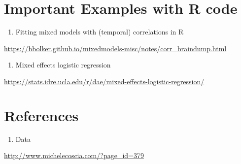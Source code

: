 \documentclass[]{book}
\providecommand{\tightlist}{%
  \setlength{\itemsep}{0pt}\setlength{\parskip}{0pt}}
\begin{document}
\hypertarget{important-examples-with-r-code}{%
\section{Important Examples with R code}\label{important-examples-with-r-code}}

\begin{enumerate}
\def\labelenumi{\arabic{enumi}.}
\tightlist
\item
  Fitting mixed models with (temporal) correlations in R
\end{enumerate}

\url{https://bbolker.github.io/mixedmodels-misc/notes/corr_braindump.html}

\begin{enumerate}
\def\labelenumi{\arabic{enumi}.}
\setcounter{enumi}{1}
\tightlist
\item
  Mixed effects logistic regression
\end{enumerate}

\url{https://stats.idre.ucla.edu/r/dae/mixed-effects-logistic-regression/}

\hypertarget{references-4}{%
\section{References}\label{references-4}}

\begin{enumerate}
\def\labelenumi{\arabic{enumi}.}
\tightlist
\item
  Data
\end{enumerate}

\url{http://www.michelecoscia.com/?page_id=379}


\end{document}
